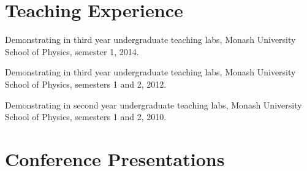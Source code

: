 \documentclass[10pt,letterpaper]{article}
\renewenvironment{itemize}{
  \begin{list}{}{
    \setlength{\leftmargin}{1.5em}
    \setlength{\itemsep}{0.25em}
    \setlength{\parskip}{0pt}
    \setlength{\parsep}{0.25em}
  }
}{
  \end{list}
}
\begin{document}
\section*{Teaching Experience}

\begin{itemize}
\item Demonstrating in third year undergraduate teaching labs, Monash University School of Physics, semester 1, 2014.
\item Demonstrating in third year undergraduate teaching labs, Monash University School of Physics, semesters 1 and 2, 2012.
\item Demonstrating in second year undergraduate teaching labs, Monash University School of Physics, semesters 1 and 2, 2010.
\end{itemize}

\section*{Conference Presentations}
\end{document}
